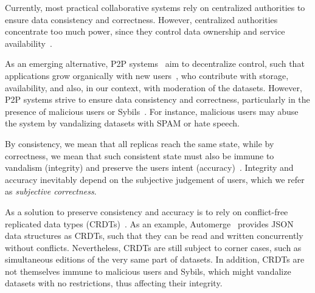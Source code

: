 \documentclass[12pt]{article}
\begin{document}
Currently, most practical collaborative systems rely on centralized authorities
to ensure data consistency and correctness.
However, centralized authorities concentrate too much power, since they control
data ownership and service availability~\cite{pincheira2022decentralized}.

As an emerging alternative, P2P systems~\cite{androutsellis2004survey} aim to
decentralize control, such that applications grow organically with new
users~\cite{rodrigues2010peer}, who contribute with storage, availability, and
also, in our context, with moderation of the datasets.
%
However, P2P systems strive to ensure data consistency and correctness,
particularly in the presence of malicious users or
Sybils~\cite{douceur2002sybil}.
For instance, malicious users may abuse the system by vandalizing datasets with
SPAM or hate speech.

By consistency, we mean that all replicas reach the same state, while by
correctness, we mean that such consistent state must also be immune to
vandalism (integrity) and preserve the users intent
(accuracy)~\cite{litt2022peritext}.
Integrity and accuracy inevitably depend on the subjective judgement of users,
which we refer as \emph{subjective correctness}.

As a solution to preserve consistency and accuracy is to rely on conflict-free
replicated data types (CRDTs)~\cite{shapiro2011conflict}.
As an example, Automerge~\cite{kleppmann2018automerge} provides JSON data
structures as CRDTs, such that they can be read and written concurrently
without conflicts.
Nevertheless, CRDTs are still subject to corner cases, such as simultaneous
editions of the very same part of datasets.
In addition, CRDTs are not themselves immune to malicious users and Sybils,
which might vandalize datasets with no restrictions, thus affecting their
integrity.

\end{document}
